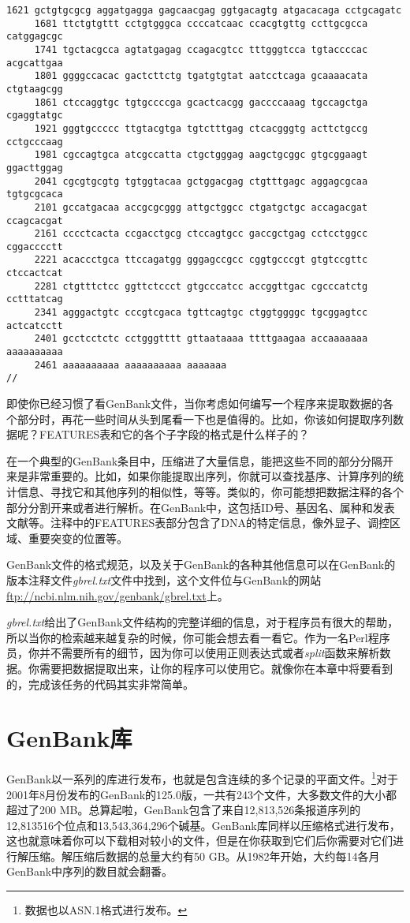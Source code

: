 \begin{lstlisting}[language={},basicstyle=\small\tt,breaklines=false]
     1621 gctgtgcgcg aggatgagga gagcaacgag ggtgacagtg atgacacaga cctgcagatc
     1681 ttctgtgttt cctgtgggca ccccatcaac ccacgtgttg ccttgcgcca catggagcgc
     1741 tgctacgcca agtatgagag ccagacgtcc tttgggtcca tgtaccccac acgcattgaa
     1801 ggggccacac gactcttctg tgatgtgtat aatcctcaga gcaaaacata ctgtaagcgg
     1861 ctccaggtgc tgtgccccga gcactcacgg gaccccaaag tgccagctga cgaggtatgc
     1921 gggtgccccc ttgtacgtga tgtctttgag ctcacgggtg acttctgccg cctgcccaag
     1981 cgccagtgca atcgccatta ctgctgggag aagctgcggc gtgcggaagt ggacttggag
     2041 cgcgtgcgtg tgtggtacaa gctggacgag ctgtttgagc aggagcgcaa tgtgcgcaca
     2101 gccatgacaa accgcgcggg attgctggcc ctgatgctgc accagacgat ccagcacgat
     2161 cccctcacta ccgacctgcg ctccagtgcc gaccgctgag cctcctggcc cggacccctt
     2221 acaccctgca ttccagatgg gggagccgcc cggtgcccgt gtgtccgttc ctccactcat
     2281 ctgtttctcc ggttctccct gtgcccatcc accggttgac cgcccatctg cctttatcag
     2341 agggactgtc cccgtcgaca tgttcagtgc ctggtggggc tgcggagtcc actcatcctt
     2401 gcctcctctc cctgggtttt gttaataaaa ttttgaagaa accaaaaaaa aaaaaaaaaa
     2461 aaaaaaaaaa aaaaaaaaaa aaaaaaa
//
\end{lstlisting}

即使你已经习惯了看GenBank文件，当你考虑如何编写一个程序来提取数据的各个部分时，再花一些时间从头到尾看一下也是值得的。比如，你该如何提取序列数据呢？FEATURES表和它的各个子字段的格式是什么样子的？

在一个典型的GenBank条目中，压缩进了大量信息，能把这些不同的部分分隔开来是非常重要的。比如，如果你能提取出序列，你就可以查找基序、计算序列的统计信息、寻找它和其他序列的相似性，等等。类似的，你可能想把数据注释的各个部分分割开来或者进行解析。在GenBank中，这包括ID号、基因名、属种和发表文献等。注释中的FEATURES表部分包含了DNA的特定信息，像外显子、调控区域、重要突变的位置等。

GenBank文件的格式规范，以及关于GenBank的各种其他信息可以在GenBank的版本注释文件\textit{gbrel.txt}文件中找到，这个文件位与GenBank的网站\href{ftp://ncbi.nlm.nih.gov/genbank/gbrel.txt}{ftp://ncbi.nlm.nih.gov/genbank/gbrel.txt}上。

\textit{gbrel.txt}给出了GenBank文件结构的完整详细的信息，对于程序员有很大的帮助，所以当你的检索越来越复杂的时候，你可能会想去看一看它。作为一名Perl程序员，你并不需要所有的细节，因为你可以使用正则表达式或者\textit{split}函数来解析数据。你需要把数据提取出来，让你的程序可以使用它。就像你在本章中将要看到的，完成该任务的代码其实非常简单。

\section{GenBank库}
GenBank以一系列的库进行发布，也就是包含连续的多个记录的平面文件。\footnote{数据也以ASN.1格式进行发布。}对于2001年8月份发布的GenBank的125.0版，一共有243个文件，大多数文件的大小都超过了200
MB。总算起啦，GenBank包含了来自12,813,526条报道序列的12,813516个位点和13,543,364,296个碱基。GenBank库同样以压缩格式进行发布，这也就意味着你可以下载相对较小的文件，但是在你获取到它们后你需要对它们进行解压缩。解压缩后数据的总量大约有50 GB。从1982年开始，大约每14各月GenBank中序列的数目就会翻番。

